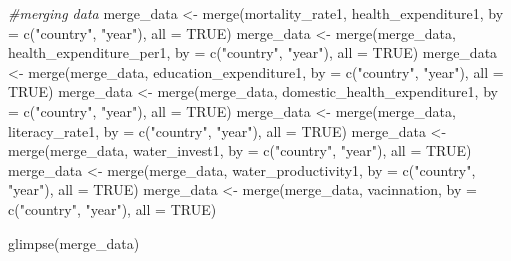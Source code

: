 \documentclass[
]{article}
\newenvironment{Shaded}{\begin{snugshade}}{\end{snugshade}}
\newcommand{\AttributeTok}[1]{\textcolor[rgb]{0.77,0.63,0.00}{#1}}
\newcommand{\CommentTok}[1]{\textcolor[rgb]{0.56,0.35,0.01}{\textit{#1}}}
\newcommand{\ConstantTok}[1]{\textcolor[rgb]{0.00,0.00,0.00}{#1}}
\newcommand{\FunctionTok}[1]{\textcolor[rgb]{0.00,0.00,0.00}{#1}}
\newcommand{\NormalTok}[1]{#1}
\newcommand{\OtherTok}[1]{\textcolor[rgb]{0.56,0.35,0.01}{#1}}
\newcommand{\StringTok}[1]{\textcolor[rgb]{0.31,0.60,0.02}{#1}}
\begin{document}
\begin{Shaded}
\begin{Highlighting}[]
\CommentTok{\#merging data}
\NormalTok{merge\_data }\OtherTok{\textless{}{-}} \FunctionTok{merge}\NormalTok{(mortality\_rate1, health\_expenditure1, }\AttributeTok{by =} \FunctionTok{c}\NormalTok{(}\StringTok{"country"}\NormalTok{, }\StringTok{"year"}\NormalTok{), }\AttributeTok{all =} \ConstantTok{TRUE}\NormalTok{)}
\NormalTok{merge\_data }\OtherTok{\textless{}{-}} \FunctionTok{merge}\NormalTok{(merge\_data, health\_expenditure\_per1, }\AttributeTok{by =} \FunctionTok{c}\NormalTok{(}\StringTok{"country"}\NormalTok{, }\StringTok{"year"}\NormalTok{), }\AttributeTok{all =} \ConstantTok{TRUE}\NormalTok{)}
\NormalTok{merge\_data }\OtherTok{\textless{}{-}} \FunctionTok{merge}\NormalTok{(merge\_data, education\_expenditure1, }\AttributeTok{by =} \FunctionTok{c}\NormalTok{(}\StringTok{"country"}\NormalTok{, }\StringTok{"year"}\NormalTok{), }\AttributeTok{all =} \ConstantTok{TRUE}\NormalTok{)}
\NormalTok{merge\_data }\OtherTok{\textless{}{-}} \FunctionTok{merge}\NormalTok{(merge\_data, domestic\_health\_expenditure1, }\AttributeTok{by =} \FunctionTok{c}\NormalTok{(}\StringTok{"country"}\NormalTok{, }\StringTok{"year"}\NormalTok{), }\AttributeTok{all =} \ConstantTok{TRUE}\NormalTok{)}
\NormalTok{merge\_data }\OtherTok{\textless{}{-}} \FunctionTok{merge}\NormalTok{(merge\_data, literacy\_rate1, }\AttributeTok{by =} \FunctionTok{c}\NormalTok{(}\StringTok{"country"}\NormalTok{, }\StringTok{"year"}\NormalTok{), }\AttributeTok{all =} \ConstantTok{TRUE}\NormalTok{)}
\NormalTok{merge\_data }\OtherTok{\textless{}{-}} \FunctionTok{merge}\NormalTok{(merge\_data, water\_invest1, }\AttributeTok{by =} \FunctionTok{c}\NormalTok{(}\StringTok{"country"}\NormalTok{, }\StringTok{"year"}\NormalTok{), }\AttributeTok{all =} \ConstantTok{TRUE}\NormalTok{)}
\NormalTok{merge\_data }\OtherTok{\textless{}{-}} \FunctionTok{merge}\NormalTok{(merge\_data, water\_productivity1, }\AttributeTok{by =} \FunctionTok{c}\NormalTok{(}\StringTok{"country"}\NormalTok{, }\StringTok{"year"}\NormalTok{), }\AttributeTok{all =} \ConstantTok{TRUE}\NormalTok{)}
\NormalTok{merge\_data }\OtherTok{\textless{}{-}} \FunctionTok{merge}\NormalTok{(merge\_data, vacinnation, }\AttributeTok{by =} \FunctionTok{c}\NormalTok{(}\StringTok{"country"}\NormalTok{, }\StringTok{"year"}\NormalTok{), }\AttributeTok{all =} \ConstantTok{TRUE}\NormalTok{)}
\end{Highlighting}
\end{Shaded}

\begin{Shaded}
\begin{Highlighting}[]
\FunctionTok{glimpse}\NormalTok{(merge\_data)}
\end{Highlighting}
\end{Shaded}
\end{document}
